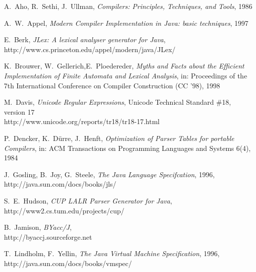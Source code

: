 \documentclass[11pt]{scrartcl}
\newcommand{\trit}{\em}
\begin{document}
\newpage  
\begin{thebibliography}{[00]} 
\label{References} 

  A.~Aho, R.~Sethi, J.~Ullman, {\trit Compilers: Principles, Techniques, and Tools}, 1986


  A.~W.~Appel, {\trit Modern Compiler Implementation in Java: basic techniques}, 1997

 E.~Berk, {\trit JLex: A lexical analyser generator for Java},\\
                   {http://www.cs.princeton.edu/appel/modern/java/JLex/}


  K.~Brouwer, W.~Gellerich,E.~Ploedereder, 
  {\trit Myths and Facts about the Efficient Implementation of Finite Automata and Lexical Analysis}, 
  in: Proceedings of the 7th International Conference on Compiler Construction (CC '98), 1998

  M.~Davis, {\trit Unicode Regular Expressions}, Unicode Technical Standard \#18, version 17\\ 
                    {http://www.unicode.org/reports/tr18/tr18-17.html}

 P.~Dencker, K.~D{\"u}rre, J.~Henft, {\trit Optimization of Parser Tables for portable Compilers}, 
 in: ACM Transactions on Programming Languages and Systems 6(4), 1984

  J.~Gosling, B.~Joy, G.~Steele, {\trit The Java Language Specifcation}, 1996,\\
                    {http://java.sun.com/docs/books/jls/}

  S.~E.~Hudson, {\trit CUP LALR Parser Generator for Java},\\  
  {http://www2.cs.tum.edu/projects/cup/}

  B.~Jamison, {\trit BYacc/J},\\
  {http://byaccj.sourceforge.net}
  
 T.~Lindholm, F.~Yellin, {\trit The Java Virtual Machine Specification}, 1996,\\
                   {http://java.sun.com/docs/books/vmspec/}
 

\end{thebibliography}
\end{document}
